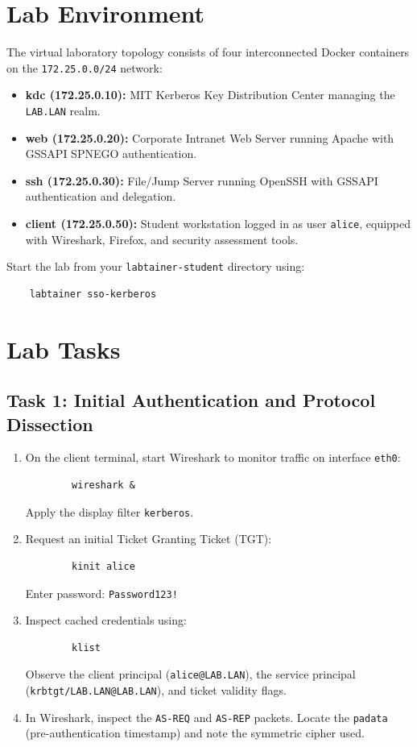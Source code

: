 \section{Lab Environment}
The virtual laboratory topology consists of four interconnected Docker containers on the {\tt 172.25.0.0/24} network:
\begin{itemize}
    \item {\bf kdc (172.25.0.10):} MIT Kerberos Key Distribution Center managing the {\tt LAB.LAN} realm.
    \item {\bf web (172.25.0.20):} Corporate Intranet Web Server running Apache with GSSAPI SPNEGO authentication.
    \item {\bf ssh (172.25.0.30):} File/Jump Server running OpenSSH with GSSAPI authentication and delegation.
    \item {\bf client (172.25.0.50):} Student workstation logged in as user {\tt alice}, equipped with Wireshark, Firefox, and security assessment tools.
\end{itemize}

Start the lab from your {\tt labtainer-student} directory using:
\begin{verbatim}
    labtainer sso-kerberos
\end{verbatim}

\section{Lab Tasks}

\subsection{Task 1: Initial Authentication and Protocol Dissection}
\begin{enumerate}
    \item On the client terminal, start Wireshark to monitor traffic on interface {\tt eth0}:
    \begin{verbatim}
        wireshark &
    \end{verbatim}
    Apply the display filter {\tt kerberos}.
    \item Request an initial Ticket Granting Ticket (TGT):
    \begin{verbatim}
        kinit alice
    \end{verbatim}
    Enter password: {\tt Password123!}
    \item Inspect cached credentials using:
    \begin{verbatim}
        klist
    \end{verbatim}
    Observe the client principal ({\tt alice@LAB.LAN}), the service principal ({\tt krbtgt/LAB.LAN@LAB.LAN}), and ticket validity flags.
    \item In Wireshark, inspect the {\tt AS-REQ} and {\tt AS-REP} packets. Locate the {\tt padata} (pre-authentication timestamp) and note the symmetric cipher used.
\end{enumerate}


